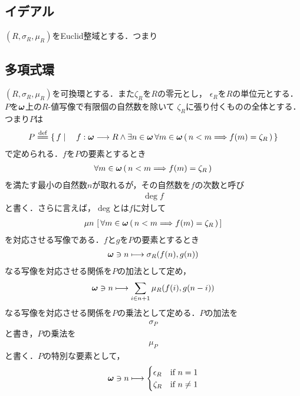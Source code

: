 \subsection{イデアル}
	$(R,\sigma_R,\mu_R)$をEuclid整域とする．つまり

\subsection{多項式環}
	$(R,\sigma_R,\mu_R)$を可換環とする．また$\zeta_R$を$R$の零元とし，
	$\epsilon_R$を$R$の単位元とする．
	$P$を${\boldsymbol \omega}$上の$R$-値写像で有限個の自然数を除いて
	$\zeta_R$に張り付くものの全体とする．つまり$P$は
	\begin{align}
		P \defeq \Set{f}{f:\Natural \longrightarrow R \wedge
		\exists n \in \Natural\, \forall m \in \Natural\,
		(\, n < m \Longrightarrow f(m) = \zeta_R\, )}
	\end{align}
	で定められる．$f$を$P$の要素とするとき
	\begin{align}
		\forall m \in {\boldsymbol \omega}\, (\, n < m \Longrightarrow f(m) = \zeta_R\, )
	\end{align}
	を満たす最小の自然数$n$が取れるが，その自然数を$f$の次数と呼び
	\begin{align}
		\deg{f}
	\end{align}
	と書く．さらに言えば，$\deg$とは$f$に対して
	\begin{align}
		\mu n\, \left[\, \forall m \in {\boldsymbol \omega}\, (\, n < m \Longrightarrow f(m) = \zeta_R\, )\, \right]
	\end{align}
	を対応させる写像である．$f$と$g$を$P$の要素とするとき
	\begin{align}
		{\boldsymbol \omega} \ni n \longmapsto \sigma_R(f(n),g(n))
	\end{align}
	なる写像を対応させる関係を$P$の加法として定め，
	\begin{align}
		{\boldsymbol \omega} \ni n \longmapsto \sum_{i \in n+1} \mu_R(f(i),g(n-i))
	\end{align}
	なる写像を対応させる関係を$P$の乗法として定める．$P$の加法を
	\begin{align}
		\sigma_P
	\end{align}
	と書き，$P$の乗法を
	\begin{align}
		\mu_P
	\end{align}
	と書く．$P$の特別な要素として，
	\begin{align}
		{\boldsymbol \omega} \ni n \longmapsto
		\begin{cases}
			\epsilon_R & \mbox{if } n = 1 \\
			\zeta_R & \mbox{if } n \neq 1
		\end{cases}
	\end{align}
